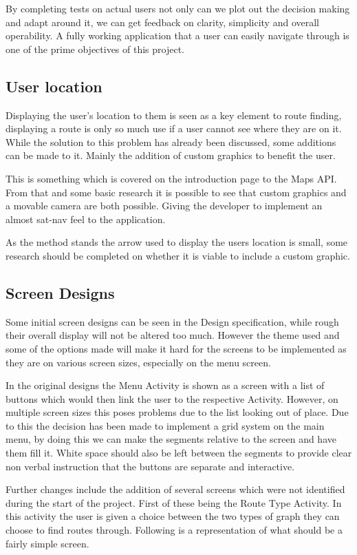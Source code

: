 By completing tests on actual users not only can we plot out the decision making and adapt around it, we can get feedback on clarity, simplicity and overall operability. A fully working application that a user can easily navigate through is one of the prime objectives of this project. 
\subsection{User location}
Displaying the user's location to them is seen as a key element to route finding, displaying a route is only so much use if a user cannot see where they are on it. While the solution to this problem has already been discussed, some additions can be made to it. Mainly the addition of custom graphics to benefit the user. 

This is something which is covered on the introduction page to the Maps API\cite{maps}. From that and some basic research it is possible to see that custom graphics and a movable camera are both possible. Giving the developer to implement an almost sat-nav feel to the application. 

As the method stands the arrow used to display the users location is small, some research should be completed on whether it is viable to include a custom graphic.
\subsection{Screen Designs}
Some initial screen designs can be seen in the Design specification, while rough their overall display will not be altered too much. However the theme used and some of the options made will make it hard for the screens to be implemented as they are on various screen sizes, especially on the menu screen.

In the original designs the Menu Activity is shown as a screen with a list of buttons which would then link the user to the respective Activity. However, on multiple screen sizes this poses problems due to the list looking out of place. Due to this the decision has been made to implement a grid system on the main menu, by doing this we can make the segments relative to the screen and have them fill it. White space should also be left between the segments to provide clear non verbal instruction that the buttons are separate and interactive. 

Further changes include the addition of several screens which were not identified during the start of the project. First of these being the Route Type Activity. In this activity the user is given a choice between the two types of graph they can choose to find routes through. Following is a representation of what should be a fairly simple screen.

